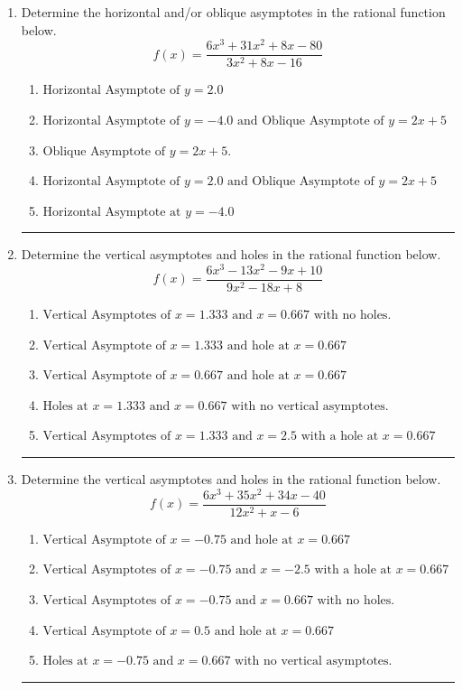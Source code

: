 \documentclass[14pt]{extbook}
\newcommand{\litem}[1]{\item#1\hspace*{-1cm}\rule{\textwidth}{0.4pt}}
\begin{document}
\begin{enumerate}
{\begin{enumerate}[label=\Alph*.]
\end{enumerate} }
\litem{
Determine the horizontal and/or oblique asymptotes in the rational function below.\[ f(x) = \frac{6x^{3} +31 x^{2} +8 x -80}{3x^{2} +8 x -16} \]\begin{enumerate}[label=\Alph*.]
\item \( \text{Horizontal Asymptote of } y = 2.0  \)
\item \( \text{Horizontal Asymptote of } y = -4.0 \text{ and Oblique Asymptote of } y = 2x + 5 \)
\item \( \text{Oblique Asymptote of } y = 2x + 5. \)
\item \( \text{Horizontal Asymptote of } y = 2.0 \text{ and Oblique Asymptote of } y = 2x + 5 \)
\item \( \text{Horizontal Asymptote at } y = -4.0 \)

\end{enumerate} }
\litem{
Determine the vertical asymptotes and holes in the rational function below.\[ f(x) = \frac{6x^{3} -13 x^{2} -9 x + 10}{9x^{2} -18 x + 8} \]\begin{enumerate}[label=\Alph*.]
\item \( \text{Vertical Asymptotes of } x = 1.333 \text{ and } x = 0.667 \text{ with no holes.} \)
\item \( \text{Vertical Asymptote of } x = 1.333 \text{ and hole at } x = 0.667 \)
\item \( \text{Vertical Asymptote of } x = 0.667 \text{ and hole at } x = 0.667 \)
\item \( \text{Holes at } x = 1.333 \text{ and } x = 0.667 \text{ with no vertical asymptotes.} \)
\item \( \text{Vertical Asymptotes of } x = 1.333 \text{ and } x = 2.5 \text{ with a hole at } x = 0.667 \)

\end{enumerate} }
\litem{
Determine the vertical asymptotes and holes in the rational function below.\[ f(x) = \frac{6x^{3} +35 x^{2} +34 x -40}{12x^{2} +x -6} \]\begin{enumerate}[label=\Alph*.]
\item \( \text{Vertical Asymptote of } x = -0.75 \text{ and hole at } x = 0.667 \)
\item \( \text{Vertical Asymptotes of } x = -0.75 \text{ and } x = -2.5 \text{ with a hole at } x = 0.667 \)
\item \( \text{Vertical Asymptotes of } x = -0.75 \text{ and } x = 0.667 \text{ with no holes.} \)
\item \( \text{Vertical Asymptote of } x = 0.5 \text{ and hole at } x = 0.667 \)
\item \( \text{Holes at } x = -0.75 \text{ and } x = 0.667 \text{ with no vertical asymptotes.} \)


\end{enumerate}}
\end{enumerate}
\end{document}
